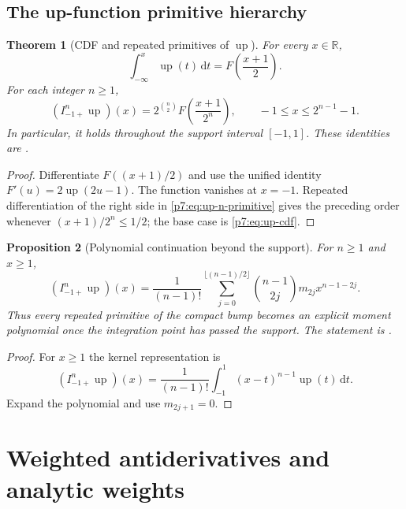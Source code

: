 \documentclass[11pt,oneside]{article}
\newtheorem{theorem}{Theorem}[section]
\newtheorem{proposition}[theorem]{Proposition}
\theoremstyle{definition}
\theoremstyle{remark}
\newcommand{\Up}{\operatorname{up}}
\newcommand{\R}{\mathbb R}
\newcommand{\dd}{\,\mathrm d}
\newcommand{\1}{\mathbf 1}
\begin{document}
\subsection{The up-function primitive hierarchy}

\begin{theorem}[CDF and repeated primitives of $\Up$]
\label{p7:thm:up-primitives}
For every $x\in\R$,
\begin{equation}
 \int_{-\infty}^{x}\Up(t)\dd t=F\!\left(\frac{x+1}{2}\right).
 \label{p7:eq:up-cdf}
\end{equation}
For each integer $n\ge1$,
\begin{equation}
 (I_{-1+}^{n}\Up)(x)
 =2^{\binom n2}F\!\left(\frac{x+1}{2^n}\right),
 \qquad -1\le x\le 2^{n-1}-1.
 \label{p7:eq:up-n-primitive}
\end{equation}
In particular, it holds throughout the support interval $[-1,1]$.  These identities are
\statusproved.
\end{theorem}

\begin{proof}
Differentiate $F((x+1)/2)$ and use the unified identity
$F'(u)=2\Up(2u-1)$.  The function vanishes at $x=-1$.  Repeated differentiation of the
right side in \cref{p7:eq:up-n-primitive} gives the preceding order whenever
$(x+1)/2^n\le1/2$; the base case is \cref{p7:eq:up-cdf}.
\end{proof}

\begin{proposition}[Polynomial continuation beyond the support]
\label{p7:prop:up-polynomial-tail}
For $n\ge1$ and $x\ge1$,
\begin{equation}
 (I_{-1+}^{n}\Up)(x)=\frac1{(n-1)!}
 \sum_{j=0}^{\lfloor(n-1)/2\rfloor}
 \binom{n-1}{2j}m_{2j}x^{n-1-2j}.
 \label{p7:eq:up-polynomial-tail}
\end{equation}
Thus every repeated primitive of the compact bump becomes an explicit moment polynomial once
the integration point has passed the support.  The statement is \statusproved.
\end{proposition}

\begin{proof}
For $x\ge1$ the kernel representation is
\[
 (I_{-1+}^{n}\Up)(x)=\frac1{(n-1)!}\int_{-1}^{1}(x-t)^{n-1}\Up(t)\dd t.
\]
Expand the polynomial and use $m_{2j+1}=0$.
\end{proof}

\section{Weighted antiderivatives and analytic weights}
\label{p7:sec:weighted}
\end{document}
